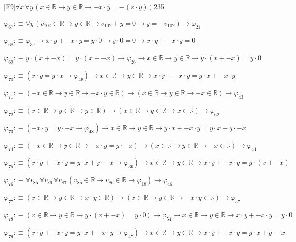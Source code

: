 \begin{fullproof}{[F9]}{$\forall x\,\forall y\,(x \in \mathbb{R} \to y \in \mathbb{R} \to -x \cdot y = -(x \cdot y))$}{235}
\begin{abbrevlist}
\item $\varphi_{67} :\equiv \forall y\,(v_{102} \in \mathbb{R} \to y \in \mathbb{R} \to v_{102} + y = 0 \to y = -v_{102}) \to \varphi_{21}$
\item $\varphi_{68} :\equiv \varphi_{30} \to x \cdot y + -x \cdot y = y \cdot 0 \to y \cdot 0 = 0 \to x \cdot y + -x \cdot y = 0$
\item $\varphi_{69} :\equiv y \cdot (x + -x) = y \cdot (x + -x) \to \varphi_{26} \to x \in \mathbb{R} \to y \in \mathbb{R} \to y \cdot (x + -x) = y \cdot 0$
\item $\varphi_{70} :\equiv (x \cdot y = y \cdot x \to \varphi_{49}) \to x \in \mathbb{R} \to y \in \mathbb{R} \to x \cdot y + -x \cdot y = y \cdot x + -x \cdot y$
\item $\varphi_{71} :\equiv (-x \in \mathbb{R} \to y \in \mathbb{R} \to -x \cdot y \in \mathbb{R}) \to (x \in \mathbb{R} \to y \in \mathbb{R} \to -x \in \mathbb{R}) \to \varphi_{43}$
\item $\varphi_{72} :\equiv (x \in \mathbb{R} \to y \in \mathbb{R} \to y \in \mathbb{R}) \to (x \in \mathbb{R} \to y \in \mathbb{R} \to x \in \mathbb{R}) \to \varphi_{62}$
\item $\varphi_{73} :\equiv (-x \cdot y = y \cdot -x \to \varphi_{48}) \to x \in \mathbb{R} \to y \in \mathbb{R} \to y \cdot x + -x \cdot y = y \cdot x + y \cdot -x$
\item $\varphi_{74} :\equiv (-x \in \mathbb{R} \to y \in \mathbb{R} \to -x \cdot y = y \cdot -x) \to (x \in \mathbb{R} \to y \in \mathbb{R} \to -x \in \mathbb{R}) \to \varphi_{44}$
\item $\varphi_{75} :\equiv (x \cdot y + -x \cdot y = y \cdot x + y \cdot -x \to \varphi_{36}) \to x \in \mathbb{R} \to y \in \mathbb{R} \to x \cdot y + -x \cdot y = y \cdot (x + -x)$
\item $\varphi_{76} :\equiv \forall v_{85}\,\forall v_{86}\,\forall v_{87}\,(v_{85} \in \mathbb{R} \to v_{86} \in \mathbb{R} \to \varphi_{18}) \to \varphi_{46}$
\item $\varphi_{77} :\equiv (x \in \mathbb{R} \to y \in \mathbb{R} \to x \cdot y \in \mathbb{R}) \to (x \in \mathbb{R} \to y \in \mathbb{R} \to -x \cdot y \in \mathbb{R}) \to \varphi_{57}$
\item $\varphi_{78} :\equiv (x \in \mathbb{R} \to y \in \mathbb{R} \to y \cdot (x + -x) = y \cdot 0) \to \varphi_{54} \to x \in \mathbb{R} \to y \in \mathbb{R} \to x \cdot y + -x \cdot y = y \cdot 0$
\item $\varphi_{79} :\equiv (x \cdot y + -x \cdot y = y \cdot x + -x \cdot y \to \varphi_{47}) \to x \in \mathbb{R} \to y \in \mathbb{R} \to x \cdot y + -x \cdot y = y \cdot x + y \cdot -x$

\end{abbrevlist}
\end{fullproof}
